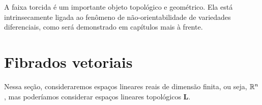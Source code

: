 A faixa torcida é um importante objeto topológico e geométrico. Ela está intrinsecamente ligada ao fenômeno de não-orientabilidade de variedades diferenciais, como será demonstrado em capítulos mais à frente.

\begin{comment}

\paragraph{Cartas Fibradas}

A descrição de um fibrado pode também ser dada na linguagem de atlas da seguinte forma. Um \emph{atlas fibrado} é um conjunto $\atlas = \{(A,h)\}$ de \emph{cartas fibradas} $(A,h)$ tal que
	\begin{enumerate}
	\item (Cobertura) $A \subseteq X$ e $E = \bigcup_{(A,h) \in \atlas} A$;
	\item (Fibração Local) $h\colon E|_{A} \to A \times F$ homeomorfismo e $\proj_A \circ h = \proj$.
	\end{enumerate}

\end{comment}

\section{Fibrados vetoriais}

Nessa seção, consideraremos espaços lineares reais de dimensão finita, ou seja, $\mathbb{R}^n$, mas poderíamos considerar espaços lineares topológicos $\bm L$.

